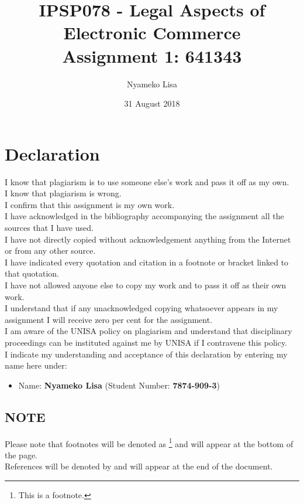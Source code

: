 \documentclass[11pt]{article}
\author{Nyameko Lisa}
\date{31 August 2018}
\title{IPSP078 - Legal Aspects of Electronic Commerce\\\medskip
\large Assignment 1: 641343}
\begin{document}
\maketitle
\addvspace{110pt}

\justifying
\addvspace{110pt}
\section*{Declaration}
\label{sec:org77e1330}
I know that plagiarism is to use someone else’s work and pass it off as my own.\\
I know that plagiarism is wrong.\\
I confirm that this assignment is my own work.\\
I have acknowledged in the bibliography accompanying the assignment all the sources that I have used.\\
I have not directly copied without acknowledgement anything from the Internet or from any other source.\\
I have indicated every quotation and citation in a footnote or bracket linked to that quotation.\\
I have not allowed anyone else to copy my work and to pass it off as their own work.\\
I understand that if any unacknowledged copying whatsoever appears in my assignment I will receive zero per cent for the assignment.\\
I am aware of the UNISA policy on plagiarism and understand that disciplinary proceedings can be instituted against me by UNISA if I contravene this policy.\\
I indicate my understanding and acceptance of this declaration by
entering my name here under:
\begin{itemize}
\item Name: \textbf{Nyameko Lisa} (Student Number: \textbf{7874-909-3})
\end{itemize}

\subsection*{NOTE}
\label{sec:orge555964}
Please note that footnotes will be denoted as \footnote{This is a footnote.} and will
appear at the bottom of the page.\\
References will be denoted by \cite{rsa02_elect_comm_trans_act} and will appear at the end of the document.
\newpage
\end{document}
